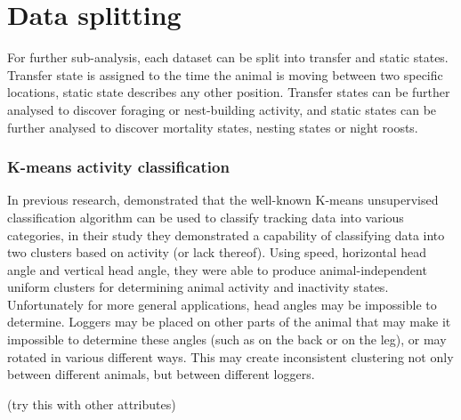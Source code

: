 \section{Data splitting}

For further sub-analysis, each dataset can be split into transfer and static states. Transfer state is assigned to the time the animal is moving between two specific locations, static state describes any other position. Transfer states can be further analysed to discover foraging or nest-building activity, and static states can be further analysed to discover mortality states, nesting states or night roosts.

\subsubsection{K-means activity classification}

In previous research, \citeauthor{schwager2007robust} demonstrated that the well-known K-means unsupervised classification algorithm can be used to classify tracking data into various categories, in their study they demonstrated a capability of classifying data into two clusters based on activity (or lack thereof). Using speed, horizontal head angle and vertical head angle, they were able to produce animal-independent uniform clusters for determining animal activity and inactivity states. Unfortunately for more general applications, head angles may be impossible to determine. Loggers may be placed on other parts of the animal that may make it impossible to determine these angles (such as on the back or on the leg), or may rotated in various different ways. This may create inconsistent clustering not only between different animals, but between different loggers.

(try this with other attributes)